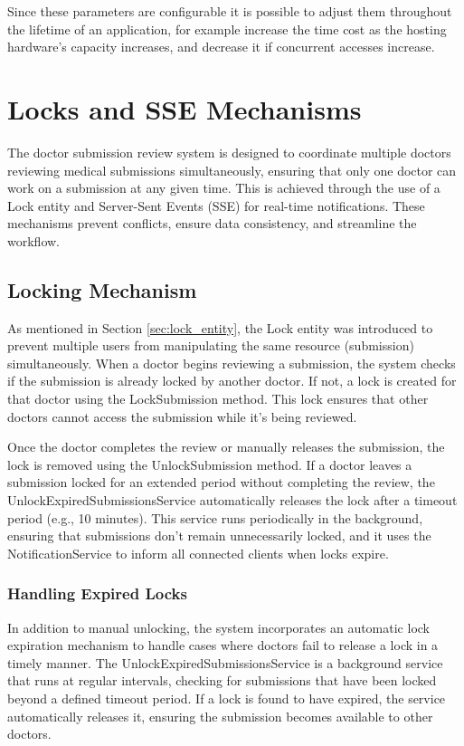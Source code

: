Since these parameters are configurable it is possible to adjust them throughout the lifetime of an application, for example increase the time cost as the hosting hardware's capacity increases, and decrease it if concurrent accesses increase.

\section{Locks and SSE Mechanisms}\label{SSE_backend}
The doctor submission review system is designed to coordinate multiple doctors reviewing medical submissions simultaneously, ensuring that only one doctor can work on a submission at any given time. This is achieved through the use of a Lock entity and Server-Sent Events (SSE) for real-time notifications. These mechanisms prevent conflicts, ensure data consistency, and streamline the workflow.

\subsection{Locking Mechanism}

As mentioned in Section \ref{sec:lock_entity}, the Lock entity was introduced to prevent multiple users from manipulating the same resource (submission) simultaneously. When a doctor begins reviewing a submission, the system checks if the submission is already locked by another doctor. If not, a lock is created for that doctor using the LockSubmission method. This lock ensures that other doctors cannot access the submission while it's being reviewed.

Once the doctor completes the review or manually releases the submission, the lock is removed using the UnlockSubmission method. If a doctor leaves a submission locked for an extended period without completing the review, the UnlockExpiredSubmissionsService automatically releases the lock after a timeout period (e.g., 10 minutes). This service runs periodically in the background, ensuring that submissions don’t remain unnecessarily locked, and it uses the NotificationService to inform all connected clients when locks expire.

\subsubsection{Handling Expired Locks}

In addition to manual unlocking, the system incorporates an automatic lock expiration mechanism to handle cases where doctors fail to release a lock in a timely manner. The UnlockExpiredSubmissionsService is a background service that runs at regular intervals, checking for submissions that have been locked beyond a defined timeout period. If a lock is found to have expired, the service automatically releases it, ensuring the submission becomes available to other doctors.

